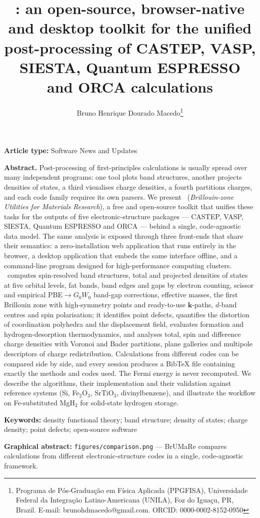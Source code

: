 \documentclass[11pt,a4paper]{article}
\title{\BMR: an open-source, browser-native and desktop toolkit for the unified post-processing of CASTEP, VASP, SIESTA, Quantum ESPRESSO and ORCA calculations}
\author{Bruno Henrique Dourado Macedo\thanks{Programa de P\'os-Gradua\c{c}\~ao em F\'isica Aplicada (PPGFISA), Universidade Federal da Integra\c{c}\~ao Latino-Americana (UNILA), Foz do Igua\c{c}u, PR, Brazil. E-mail: brunohdmacedo@gmail.com. ORCID: 0000-0002-8152-0950}}
\date{}
\begin{document}
\maketitle
\noindent\textbf{Article type:} Software News and Updates\par\medskip
\noindent\textbf{Abstract.} Post-processing of first-principles calculations is usually spread over many independent programs: one tool plots band structures, another projects densities of states, a third visualises charge densities, a fourth partitions charges, and each code family requires its own parsers. We present \BMR\ (\emph{Brillouin-zone Utilities for Materials Research}), a free and open-source toolkit that unifies these tasks for the outputs of five electronic-structure packages — CASTEP, VASP, SIESTA, Quantum ESPRESSO and ORCA — behind a single, code-agnostic data model. The same analysis is exposed through three front-ends that share their semantics: a zero-installation web application that runs entirely in the browser, a desktop application that embeds the same interface offline, and a command-line program designed for high-performance computing clusters. \BMR\ computes spin-resolved band structures, total and projected densities of states at five orbital levels, fat bands, band edges and gaps by electron counting, scissor and empirical PBE$\to G_0W_0$ band-gap corrections, effective masses, the first Brillouin zone with high-symmetry points and ready-to-use $\bm k$-paths, $d$-band centres and spin polarisation; it identifies point defects, quantifies the distortion of coordination polyhedra and the displacement field, evaluates formation and hydrogen-desorption thermodynamics, and analyses total, spin and difference charge densities with Voronoi and Bader partitions, plane galleries and multipole descriptors of charge redistribution. Calculations from different codes can be compared side by side, and every session produces a BibTeX file containing exactly the methods and codes used. The Fermi energy is never recomputed. We describe the algorithms, their implementation and their validation against reference systems (Si, Fe$_2$O$_3$, SrTiO$_3$, divinylbenzene), and illustrate the workflow on Fe-substituted MgH$_2$ for solid-state hydrogen storage.\par\medskip
\noindent\textbf{Keywords:} density functional theory; band structure; density of states; charge density; point defects; open-source software\par\medskip
\noindent\textbf{Graphical abstract:} \texttt{figures/comparison.png} — BrUMaRe compares calculations from different electronic-structure codes in a single, code-agnostic framework.
\linenumbers









\end{document}
